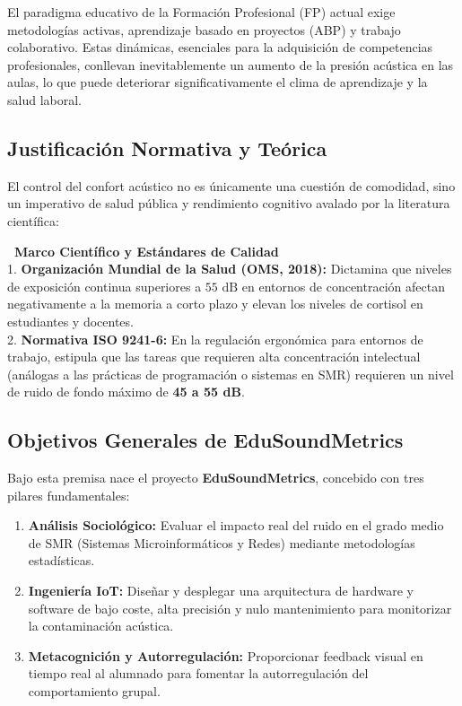 \documentclass[11pt,a4paper]{article}
\begin{document}
El paradigma educativo de la Formación Profesional (FP) actual exige metodologías activas, aprendizaje basado en proyectos (ABP) y trabajo colaborativo. Estas dinámicas, esenciales para la adquisición de competencias profesionales, conllevan inevitablemente un aumento de la presión acústica en las aulas, lo que puede deteriorar significativamente el clima de aprendizaje y la salud laboral.

\subsection{Justificación Normativa y Teórica}
El control del confort acústico no es únicamente una cuestión de comodidad, sino un imperativo de salud pública y rendimiento cognitivo avalado por la literatura científica:

\begin{HighlightBox}
\textbf{\faBook\ Marco Científico y Estándares de Calidad}\\
1. \textbf{Organización Mundial de la Salud (OMS, 2018):} Dictamina que niveles de exposición continua superiores a $55\text{ dB}$ en entornos de concentración afectan negativamente a la memoria a corto plazo y elevan los niveles de cortisol en estudiantes y docentes.\\
2. \textbf{Normativa ISO 9241-6:} En la regulación ergonómica para entornos de trabajo, estipula que las tareas que requieren alta concentración intelectual (análogas a las prácticas de programación o sistemas en SMR) requieren un nivel de ruido de fondo máximo de \textbf{45 a 55 dB}.
\end{HighlightBox}

\subsection{Objetivos Generales de EduSoundMetrics}
Bajo esta premisa nace el proyecto \textbf{EduSoundMetrics}, concebido con tres pilares fundamentales:
\begin{enumerate}
    \item \textbf{Análisis Sociológico:} Evaluar el impacto real del ruido en el grado medio de SMR (Sistemas Microinformáticos y Redes) mediante metodologías estadísticas.
    \item \textbf{Ingeniería IoT:} Diseñar y desplegar una arquitectura de hardware y software de bajo coste, alta precisión y nulo mantenimiento para monitorizar la contaminación acústica.
    \item \textbf{Metacognición y Autorregulación:} Proporcionar feedback visual en tiempo real al alumnado para fomentar la autorregulación del comportamiento grupal.
\end{enumerate}
\end{document}
